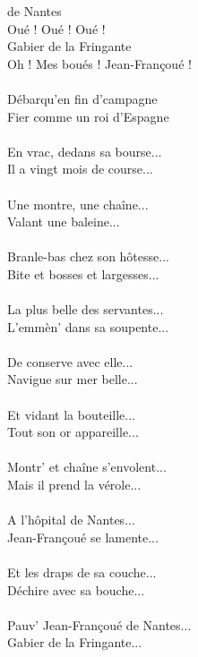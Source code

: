
 de Nantes
\\Oué ! Oué ! Oué !
\\Gabier de la Fringante
\\Oh ! Mes boués ! Jean-Françoué !
\\\\Débarqu'en fin d'campagne
\\Fier comme un roi d'Espagne
\\\\En vrac, dedans sa bourse...
\\Il a vingt mois de course...
\\\\Une montre, une chaîne...
\\Valant une baleine...
\\\\Branle-bas chez son hôtesse...
\\Bite et bosses et largesses...
\\\\La plus belle des servantes...
\\L'emmèn' dans sa soupente...
\\\\De conserve avec elle...
\\Navigue sur mer belle...
\\\\Et vidant la bouteille...
\\Tout son or appareille...
\\\\Montr' et chaîne s'envolent...
\\Mais il prend la vérole...
\\\\A l'hôpital de Nantes...
\\Jean-Françoué se lamente...
\\\\Et les draps de sa couche...
\\Déchire avec sa bouche...
\\\\Pauv' Jean-Françoué de Nantes...
\\Gabier de la Fringante...

\breakpage